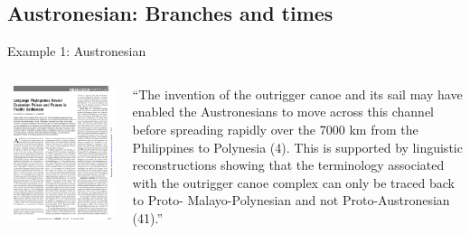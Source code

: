 \documentclass[9pt]{beamer}
\begin{document}
\subsection{Austronesian: Branches and times}
\begin{frame}{Example 1: Austronesian}
  \begin{columns}
    \begin{column}{0.5\textwidth}
      \includegraphics[width=\textwidth,page=2,trim={2cm 4cm 1cm 5cm},clip]{austronesian.pdf}
    \end{column}
    \begin{column}{0.5\textwidth}
      \footnotesize “The invention of the outrigger canoe and its
        sail may have enabled the Austronesians to move across this
        channel before spreading rapidly over the 7000 km from the
        Philippines to Polynesia (4). This is supported by linguistic
        reconstructions showing that the terminology associated with
        the outrigger canoe complex can only be traced back to Proto-
        Malayo-Polynesian and not Proto-Austronesian (41).”

\end{column}
\end{columns}
\end{frame}
\end{document}
